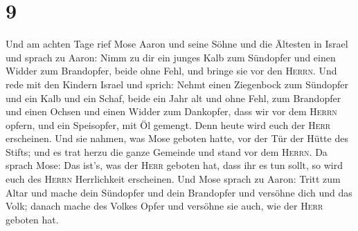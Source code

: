 \hypertarget{section-8}{%
\section{9}\label{section-8}}

 Und am achten Tage rief Mose Aaron und seine Söhne und
die Ältesten in Israel  und sprach zu Aaron: Nimm zu dir
ein junges Kalb zum Sündopfer und einen Widder zum Brandopfer, beide
ohne Fehl, und bringe sie vor den \textsc{Herrn}.  Und
rede mit den Kindern Israel und sprich: Nehmt einen Ziegenbock zum
Sündopfer und ein Kalb und ein Schaf, beide ein Jahr alt und ohne Fehl,
zum Brandopfer  und einen Ochsen und einen Widder zum
Dankopfer, dass wir vor dem \textsc{Herrn} opfern, und ein Speisopfer,
mit Öl gemengt. Denn heute wird euch der \textsc{Herr} erscheinen.
 Und sie nahmen, was Mose geboten hatte, vor der Tür der
Hütte des Stifts; und es trat herzu die ganze Gemeinde und stand vor dem
\textsc{Herrn}.  Da sprach Mose: Das ist's, was der
\textsc{Herr} geboten hat, dass ihr es tun sollt, so wird euch des
\textsc{Herrn} Herrlichkeit erscheinen.  Und Mose sprach
zu Aaron: Tritt zum Altar und mache dein Sündopfer und dein Brandopfer
und versöhne dich und das Volk; danach mache des Volkes Opfer und
versöhne sie auch, wie der \textsc{Herr} geboten hat.

